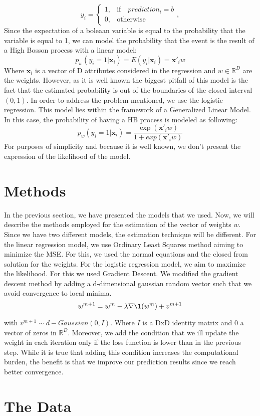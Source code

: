 \documentclass[10pt,conference,compsocconf]{IEEEtran}
\newcommand{\R}{\mathbb{R}}
\begin{document}
 $$
y_{i}=
\begin{cases}
1, & \text{if} \quad prediction_i=b\\
0, & \text{otherwise}
\end{cases}
, 
$$
Since the expectation of a boleaan variable is equal to the probability that the variable is equal to 1, we can model the probability that the event is the result of a High Bosson process with a linear model:
$$p_w(y_i=1|\textbf{x}_i)=E(y_i|\textbf{x}_i)=\textbf{x}'_i w$$
Where $\textbf{x}_i $ is a vector of D attributes considered in the regression and $w \in \R^D $ are the weights.
However, as it is well known the biggest pitfall of this model is the fact that the estimated probability is out of the boundaries of the closed interval $ ( 0,1 ) $. 
In order to address the problem mentioned, we use the logistic regression. This model lies within the framework of a Generalized Linear Model.  In this case, the probability of having a HB process is modeled as following:
$$p_w(y_i=1|\textbf{x}_i)=\frac{\exp(\textbf{x}'_i w)}{1+exp(\textbf{x}'_i w)}$$
For purposes of simplicity and because it is well known, we don't present the expression of the likelihood of the model.
\section{Methods}
In the previous section, we have presented the models that we used. Now, we will describe the methods employed for the estimation of the vector of weights $w$. Since we have two different models, the estimation technique will be different. 
For the linear regression model, we use Ordinary Least Squares method aiming to minimize the MSE. For this, we used the normal equations and the closed from solution for the weights. 
For the logistic regression model, we aim to maximize the likelihood. For this we used Gradient Descent. We modified the gradient descent method by adding a d-dimensional gaussian random vector such that we avoid convergence to local minima. 
$$w^{m+1}=w^{m}-\lambda  \nabla \l(w^m) +v^{m+1}$$

with $v^{m+1} \sim d-Gaussian(0,I)$. Where $I$ is a DxD identity matrix and 0 a vector of zeros in $\R^D$.
Moreover, we add the condition that we ill update the weight in each iteration only if the loss function is lower than in the previous step. While it is true that adding this condition increases the computational burden, the benefit is that we improve our prediction results since we reach better convergence.
\section{The Data}
\label{S1}
\end{document}
